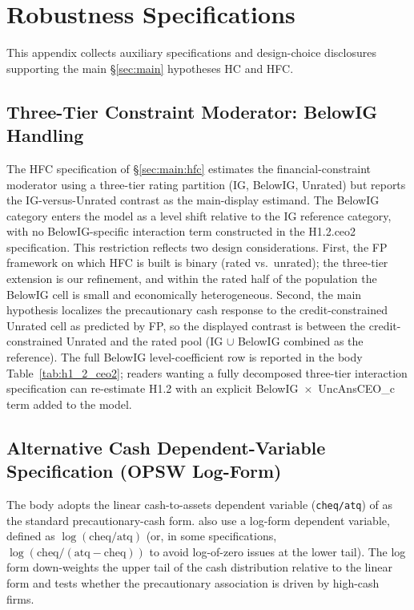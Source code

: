 
\section{Robustness Specifications}
\label{app:robustness}

This appendix collects auxiliary specifications and design-choice disclosures supporting the main \S\ref{sec:main} hypotheses HC and HFC.

\subsection{Three-Tier Constraint Moderator: BelowIG Handling}
\label{app:robustness:belowig}

The HFC specification of \S\ref{sec:main:hfc} estimates the financial-constraint moderator using a three-tier rating partition (IG, BelowIG, Unrated) but reports the IG-versus-Unrated contrast as the main-display estimand. The BelowIG category enters the model as a level shift relative to the IG reference category, with no BelowIG-specific interaction term constructed in the H1.2.ceo2 specification. This restriction reflects two design considerations. First, the FP framework on which HFC is built is binary (rated vs.\ unrated); the three-tier extension is our refinement, and within the rated half of the population the BelowIG cell is small and economically heterogeneous. Second, the main hypothesis localizes the precautionary cash response to the credit-constrained Unrated cell as predicted by FP, so the displayed contrast is between the credit-constrained Unrated and the rated pool (IG $\cup$ BelowIG combined as the reference). The full BelowIG level-coefficient row is reported in the body Table~\ref{tab:h1_2_ceo2}; readers wanting a fully decomposed three-tier interaction specification can re-estimate H1.2 with an explicit BelowIG~$\times$~UncAnsCEO\_c term added to the model.

\subsection{Alternative Cash Dependent-Variable Specification (OPSW Log-Form)}
\label{app:robustness:opsw}

The body adopts the linear cash-to-assets dependent variable (\texttt{cheq/atq}) of  as the standard precautionary-cash form.  also use a log-form dependent variable, defined as $\log(\text{cheq}/\text{atq})$ (or, in some specifications, $\log(\text{cheq}/(\text{atq}-\text{cheq}))$ to avoid log-of-zero issues at the lower tail). The log form down-weights the upper tail of the cash distribution relative to the linear form and tests whether the precautionary association is driven by high-cash firms.

